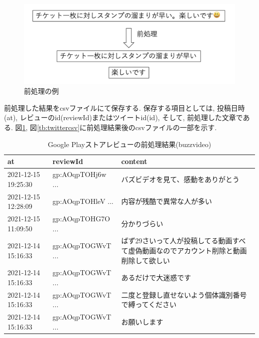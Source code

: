 \begin{figure}[hbtp]
 \centering
 \includegraphics[scale=0.5]
      {contents/images/preprocessing.png}
 \caption{前処理の例\label{chap:preprocessing}}
\end{figure}

前処理した結果をcsvファイルにて保存する. 保存する項目としては, 投稿日時(at), レビューのid(reviewId)またはツイートid(id), そして, 前処理した文章である. 図\ref{tb:googlecsv}, 図\ref{tb:twittercsv}に前処理結果後のcsvファイルの一部を示す. 

\begin{table}[htbp]
  \caption{Google Playストアレビューの前処理結果(buzzvideo)}
  \label{tb:googlecsv}
  \begin{center}
  \begin{tabularx}{\linewidth}{|l|l|X|}
    \hline
    at&reviewId&content\\\hline\hline
    2021-12-15 19:25:30&gp:AOqpTOHj6w ...&バズビデオを見て、感動をありがとう\\\hline
    2021-12-15 12:28:09&gp:AOqpTOHleV ...&内容が残酷で異常な人が多い\\\hline
    2021-12-15 11:09:50&gp:AOqpTOHG7O ...&分かりづらい\\\hline
    2021-12-14 15:16:33&gp:AOqpTOGWvT ...&ばず29さいって人が投稿してる動画すべて虚偽動画なのでアカウント削除と動画削除して欲しい\\\hline
    2021-12-14 15:16:33&gp:AOqpTOGWvT ...&あるだけで大迷惑です\\\hline
    2021-12-14 15:16:33&gp:AOqpTOGWvT ...&二度と登録し直せないよう個体識別番号で縛ってください\\\hline
    2021-12-14 15:16:33&gp:AOqpTOGWvT ...&お願いします\\\hline
  \end{tabularx}\end{center}
\end{table}

